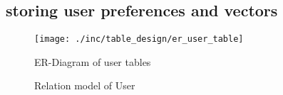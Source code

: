 \subsection{storing user preferences and vectors}

\begin{figure}[h]
    \texttt{[image: ./inc/table\_design/er\_user\_table]}
    \caption{ER-Diagram of user tables}
\end{figure}


\begin{figure}[h]
    \caption{Relation model of User}
\end{figure}

